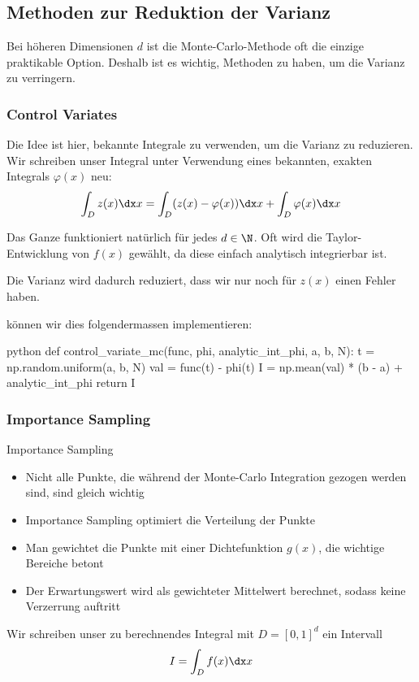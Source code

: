
\newsection
\subsection{Methoden zur Reduktion der Varianz}
Bei höheren Dimensionen $d$ ist die Monte-Carlo-Methode oft die einzige praktikable Option.
Deshalb ist es wichtig, Methoden zu haben, um die Varianz zu verringern.

\subsubsection{Control Variates}
Die Idee ist hier, bekannte Integrale zu verwenden, um die Varianz zu reduzieren.
Wir schreiben unser Integral unter Verwendung eines bekannten, exakten Integrals $\varphi(x)$ neu:
\rmvspace
\begin{align*}
    \int_D z(x)\dx x = \int_D (z(x)-\varphi(x))\dx x + \int_D\varphi(x)\dx x
\end{align*}

\drmvspace
Das Ganze funktioniert natürlich für jedes $d \in \N$.
Oft wird die Taylor-Entwicklung von $f(x)$ gewählt, da diese einfach analytisch integrierbar ist.

Die Varianz wird dadurch reduziert, dass wir nur noch für $z(x)$ einen Fehler haben.

\innumpy können wir dies folgendermassen implementieren:
\begin{code}{python}
    def control_variate_mc(func, phi, analytic_int_phi, a, b, N):
        t = np.random.uniform(a, b, N)
        val = func(t) - phi(t)
        I = np.mean(val) * (b - a) + analytic_int_phi
        return I
\end{code}


\subsubsection{Importance Sampling}
\begin{intuition}[]{Importance Sampling}
    \begin{itemize}
        \item Nicht alle Punkte, die während der Monte-Carlo Integration gezogen werden sind, sind gleich wichtig
        \item Importance Sampling optimiert die Verteilung der Punkte
        \item Man gewichtet die Punkte mit einer Dichtefunktion $g(x)$, die wichtige Bereiche betont
        \item Der Erwartungswert wird als gewichteter Mittelwert berechnet, sodass keine Verzerrung auftritt
    \end{itemize}
\end{intuition}
Wir schreiben unser zu berechnendes Integral mit $D = [0, 1]^d$ ein Intervall
\rmvspace
\begin{align*}
    I = \int_D f(x) \dx x
\end{align*}

